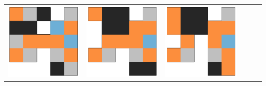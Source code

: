 \begin{tabular}{cccccc}
    \includegraphics[scale=0.1]{images/top_designs/walker/ga/ga6_gen29_ind3} &
    \includegraphics[scale=0.1]{images/top_designs/walker/ga/ga6_gen29_ind4} &
    \includegraphics[scale=0.1]{images/top_designs/walker/ga/ga6_gen29_ind5}\\
\end{tabular}
